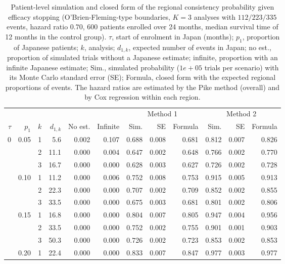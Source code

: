 \begin{table}[ht]
\centering
\footnotesize
\setlength{\tabcolsep}{3.5pt}
\caption{Patient-level simulation and closed form of the regional consistency probability given efficacy stopping (O'Brien-Fleming-type boundaries, $K = 3$ analyses with $112/223/335$ events, hazard ratio $0.70$, $600$ patients enrolled over 24 months, median survival time of 12 months in the control group). $\tau$, start of enrolment in Japan (months); $p_{1}$, proportion of Japanese patients; $k$, analysis; $d_{1,k}$, expected number of events in Japan; no est., proportion of simulated trials without a Japanese estimate; infinite, proportion with an infinite Japanese estimate; Sim., simulated probability ($1e+05$ trials per scenario) with its Monte Carlo standard error (SE); Formula, closed form with the expected regional proportions of events. The hazard ratios are estimated by the Pike method (overall) and by Cox regression within each region.}
\label{tab:simulation}
\begin{tabular}{rrr rrr rrr rrr}
\toprule
 & & & & & & \multicolumn{3}{c}{Method 1} & \multicolumn{3}{c}{Method 2} \\
\cmidrule(lr){7-9}\cmidrule(lr){10-12}
$\tau$ & $p_{1}$ & $k$ & $d_{1,k}$ & No est. & Infinite & Sim. & SE & Formula & Sim. & SE & Formula \\
\midrule
0 & 0.05 & 1 & 5.6 & 0.002 & 0.107 & 0.688 & 0.008 & 0.681 & 0.812 & 0.007 & 0.826 \\
 &  & 2 & 11.1 & 0.000 & 0.004 & 0.647 & 0.002 & 0.648 & 0.766 & 0.002 & 0.770 \\
 &  & 3 & 16.7 & 0.000 & 0.000 & 0.628 & 0.003 & 0.627 & 0.726 & 0.002 & 0.728 \\
 & 0.10 & 1 & 11.2 & 0.000 & 0.006 & 0.752 & 0.008 & 0.753 & 0.915 & 0.005 & 0.913 \\
 &  & 2 & 22.3 & 0.000 & 0.000 & 0.707 & 0.002 & 0.709 & 0.852 & 0.002 & 0.855 \\
 &  & 3 & 33.5 & 0.000 & 0.000 & 0.675 & 0.003 & 0.681 & 0.801 & 0.002 & 0.806 \\
 & 0.15 & 1 & 16.8 & 0.000 & 0.000 & 0.804 & 0.007 & 0.805 & 0.947 & 0.004 & 0.956 \\
 &  & 2 & 33.5 & 0.000 & 0.000 & 0.752 & 0.002 & 0.755 & 0.901 & 0.001 & 0.903 \\
 &  & 3 & 50.3 & 0.000 & 0.000 & 0.726 & 0.002 & 0.723 & 0.853 & 0.002 & 0.853 \\
 & 0.20 & 1 & 22.4 & 0.000 & 0.000 & 0.833 & 0.007 & 0.847 & 0.977 & 0.003 & 0.977 \\

\end{tabular}
\end{table}
